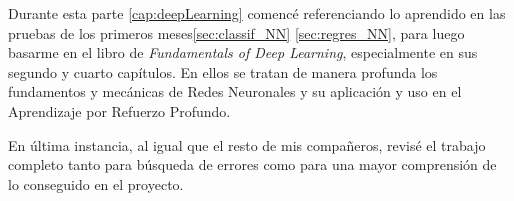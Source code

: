 Durante esta parte \ref{cap:deepLearning} comencé referenciando lo aprendido en las pruebas de los primeros meses\ref{sec:classif_NN} \ref{sec:regres_NN}, para luego basarme en el libro de \textit{Fundamentals of Deep Learning}, especialmente en sus segundo\citep{Buduma:backprop} y cuarto \citep{Buduma:dnn} capítulos. En ellos se tratan de manera profunda los fundamentos y mecánicas de Redes Neuronales y su aplicación y uso en el Aprendizaje por Refuerzo Profundo.

En última instancia, al igual que el resto de mis compañeros, revisé el trabajo completo tanto para búsqueda de errores como para una mayor comprensión de lo conseguido en el proyecto.
